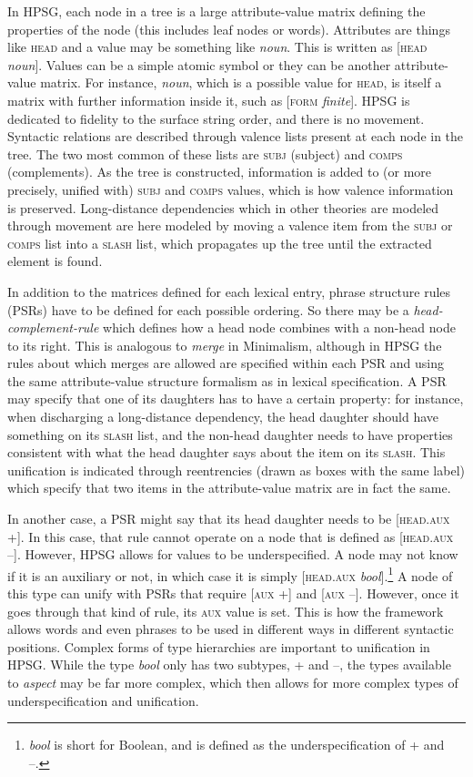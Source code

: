 In HPSG, each node in a tree is a large attribute-value matrix defining the properties of the node (this includes leaf nodes or words). Attributes are things like \textsc{head} and a value may be something like \textit{noun}. This is written as [\textsc{head} \textit{noun}]. Values can be a simple atomic symbol or they can be another attribute-value matrix. For instance, \textit{noun}, which is a possible value for \textsc{head}, is itself a matrix with further information inside it, such as [\textsc{form} \textit{finite}]. HPSG is dedicated to fidelity to the surface string order, and there is no movement. Syntactic relations are described through valence lists present at each node in the tree. The two most common of these lists are \textsc{subj} (subject) and \textsc{comps} (complements). As the tree is constructed, information is added to (or more precisely, unified with) \textsc{subj} and \textsc{comps} values, which is how valence information is preserved. Long-distance dependencies which in other theories are modeled through movement are here modeled by moving a valence item from the \textsc{subj} or \textsc{comps} list into a \textsc{slash} list, which propagates up the tree until the extracted element is found.

In addition to the matrices defined for each lexical entry, phrase structure rules (PSRs) have to be defined for each possible ordering. So there may be a {\textit{head-complement-rule}} which defines how a head node combines with a non-head node to its right. This is analogous to \textit{merge} in Minimalism, although in HPSG the rules about which merges are allowed are specified within each PSR and using the same attribute-value structure formalism as in lexical specification. A PSR may specify that one of its daughters has to have a certain property: for instance, when discharging a long-distance dependency, the head daughter should have something on its \textsc{slash} list, and the non-head daughter needs to have properties consistent with what the head daughter says about the item on its \textsc{slash}. This unification is indicated through reentrencies (drawn as boxes with the same label) which specify that two items in the attribute-value matrix are in fact the same.

In another case, a PSR might say that its head daughter needs to be [\textsc{head.aux} +]. In this case, that rule cannot operate on a node that is defined as [\textsc{head.aux} --]. However, HPSG allows for values to be underspecified. A node may not know if it is an auxiliary or not, in which case it is simply [\textsc{head.aux} \textit{bool}].\footnote{\textit{bool} is short for Boolean, and is defined as the underspecification of + and --.} A node of this type can unify with PSRs that require [\textsc{aux} +] and [\textsc{aux} --]. However, once it goes through that kind of rule, its \textsc{aux} value is set. This is how the framework allows words and even phrases to be used in different ways in different syntactic positions. Complex forms of type hierarchies are important to unification in HPSG. While the type \textit{bool} only has two subtypes, + and --, the types available to \textit{aspect} may be far more complex, which then allows for more complex types of underspecification and unification.

